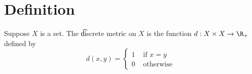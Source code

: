 
\section*{Definition}

Suppose $X$ is a set.
The \t{discrete metric} on $X$ is the function $d: X \times  X \to \R _+$ defined by
\[
d(x, y) = \begin{cases}
1 & \text{ if } x = y \\
0 & \text{ otherwise }
\end{cases}
\]

\blankpage